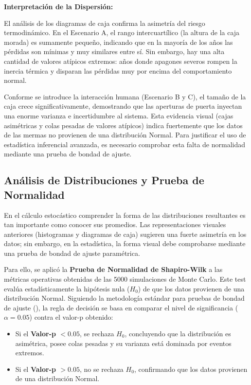 \documentclass[
  spanish,
  us-letterpaper,
]{scrreprt}
\providecommand{\tightlist}{%
  \setlength{\itemsep}{0pt}\setlength{\parskip}{0pt}}
\numberwithin{equation}{section}
\theoremstyle{plain}
\theoremstyle{plain}
\theoremstyle{plain}
\theoremstyle{definition}
\theoremstyle{remark}
\begin{document}
\textbf{Interpretación de la Dispersión:}

El análisis de los diagramas de caja confirma la asimetría del riesgo
termodinámico. En el Escenario A, el rango intercuartílico (la altura de
la caja morada) es sumamente pequeño, indicando que en la mayoría de los
años las pérdidas son mínimas y muy similares entre sí. Sin embargo, hay
una alta cantidad de valores atípicos extremos: años donde apagones
severos rompen la inercia térmica y disparan las pérdidas muy por encima
del comportamiento normal.

Conforme se introduce la interacción humana (Escenario B y C), el tamaño
de la caja crece significativamente, demostrando que las aperturas de
puerta inyectan una enorme varianza e incertidumbre al sistema. Esta
evidencia visual (cajas asimétricas y colas pesadas de valores atípicos)
indica fuertemente que los datos de las mermas no provienen de una
distribución Normal. Para justificar el uso de estadística inferencial
avanzada, es necesario comprobar esta falta de normalidad mediante una
prueba de bondad de ajuste.

\subsection{Análisis de Distribuciones y Prueba de
Normalidad}\label{anuxe1lisis-de-distribuciones-y-prueba-de-normalidad}

En el cálculo estocástico comprender la forma de las distribuciones
resultantes es tan importante como conocer sus promedios. Las
representaciones visuales anteriores (histogramas y diagramas de caja)
sugieren una fuerte asimetría en los datos; sin embargo, en la
estadística, la forma visual debe comprobarse mediante una prueba de
bondad de ajuste paramétrica.

Para ello, se aplicó la \textbf{Prueba de Normalidad de Shapiro-Wilk} a
las métricas operativas obtenidas de las 5000 simulaciones de Monte
Carlo. Este test evalúa estadísticamente la hipótesis nula (\(H_0\)) de
que los datos provienen de una distribución Normal. Siguiendo la
metodología estándar para pruebas de bondad de ajuste
(), la
regla de decisión se basa en comparar el nivel de significancia
(\(\alpha = 0.05\)) contra el valor-p obtenido:

\begin{itemize}
\tightlist
\item
  Si el \textbf{Valor-p \(< 0.05\)}, se rechaza \(H_0\), concluyendo que
  la distribución es asimétrica, posee colas pesadas y su varianza está
  dominada por eventos extremos.
\item
  Si el \textbf{Valor-p \(> 0.05\)}, no se rechaza \(H_0\), confirmando
  que los datos provienen de una distribución Normal.
\end{itemize}
\end{document}
